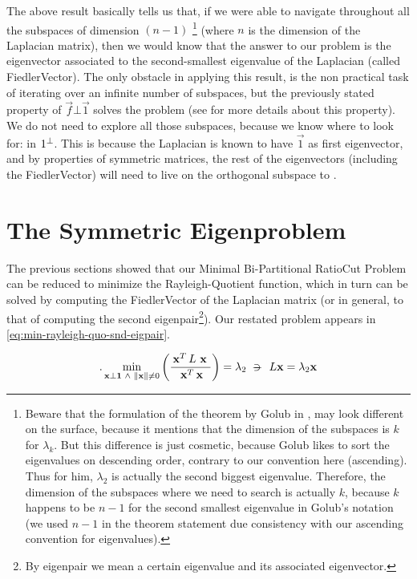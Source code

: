 The above result basically tells us that, if we were able to navigate
throughout all the subspaces of dimension $(n-1)$
\footnote{Beware that the formulation of the theorem by Golub in
  \cite{golub13}, may look different on the surface, because it
  mentions that the dimension of the subspaces is $k$ for $\lambda_k$. But
this difference is just cosmetic, because Golub likes to sort the
eigenvalues on descending order, contrary to our convention here
(ascending). Thus for him, $\lambda_2$ is actually
the second biggest eigenvalue. Therefore, the dimension of the
subspaces where we need to search is actually $k$, because $k$ happens
to be $n-1$ for the second smallest eigenvalue in Golub's notation (we
used $n-1$ in the theorem statement due consistency with our ascending
convention for eigenvalues).} 
(where $n$ is the
dimension of the \gls{Laplacian} matrix), then we would know that the answer
to our problem is the eigenvector associated to the second-smallest
eigenvalue of the \gls{Laplacian} (called \gls{FiedlerVector}). The only obstacle
in applying this result, is the non practical task of iterating
over an infinite number of subspaces, but the previously stated
property of $\vec{f} \bot \vec{1}$ solves the problem (see
\cite{luxburg07} for more details about this property). We do not need to
explore all those subspaces, because we know where to look for: in
${1}^{\bot}$. This is because the \gls{Laplacian} is known to have $\vec{1}$ as first
eigenvector, and by properties of symmetric matrices, the rest of the
eigenvectors (including the \gls{FiedlerVector}) will need to live on the
orthogonal subspace to . 

\section{The Symmetric Eigenproblem}

The previous sections showed that our Minimal Bi-Partitional RatioCut
Problem can be reduced to minimize the Rayleigh-Quotient function,
which in turn can be solved by computing the \gls{FiedlerVector} of the
\gls{Laplacian} matrix (or in general, to that of computing the second
eigenpair\footnote{By eigenpair we mean a certain eigenvalue and its
  associated eigenvector.}). Our restated problem appears in
\cref{eq:min-rayleigh-quo-snd-eigpair}.

\begin{equation}
  \label{eq:min-rayleigh-quo-snd-eigpair}.  
  \min\limits_{\vec{x} \bot \vec{1} \ds{\land} \norm{\vec{x}} \ne 0}
  \left(  
  \dfrac{\trans{\vec{x}} L \ds{\vec{x}}}{\trans{\vec{x}} \vec{x}}
  \right)
  = \lambda_2
  \suchthat{L\vec{x} = \lambda_2\vec{x}}  
\end{equation}
\joinbelow{1cm}

